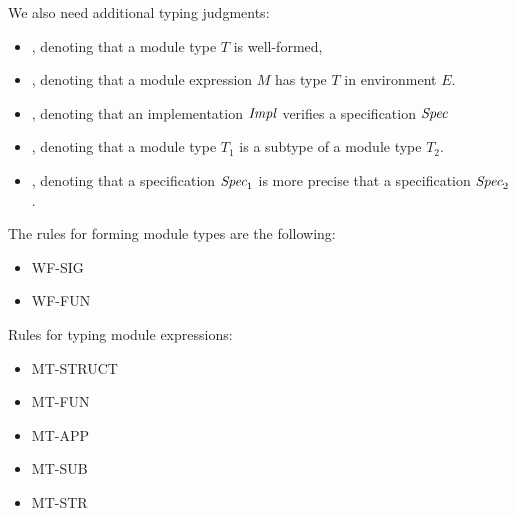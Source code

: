 We also need additional typing judgments: 
\begin{itemize}
\item {}, denoting that a module type $T$ is well-formed, 

\item {}, denoting that a module expression $M$ has type $T$ in
environment $E$.

\item {}, denoting that an implementation ${\it Impl}$
  verifies a specification $\textit{Spec}$

\item {}, denoting that a module type $T_1$ is a subtype of a
module type $T_2$.

\item {}, denoting that a specification
  $\textit{Spec}_1$ is more precise that a specification $\textit{Spec}_2$.
\end{itemize}
The rules for forming module types are the following:
\begin{itemize}
\item [] WF-SIG
\item [] WF-FUN
\end{itemize}
Rules for typing module expressions:
\begin{itemize}
\item [] MT-STRUCT
\item [] MT-FUN
\item [] MT-APP
\item [] MT-SUB
\item [] MT-STR
\end{itemize}
